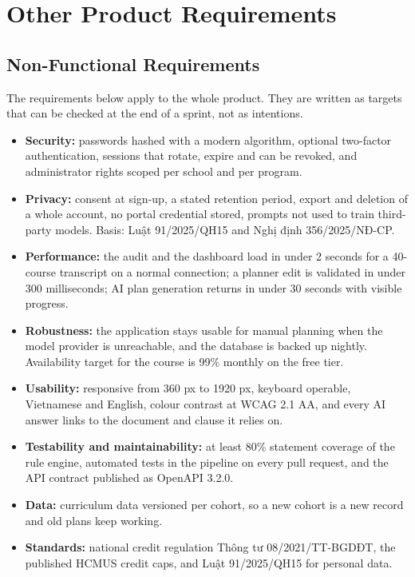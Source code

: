 \documentclass{article}
\begin{document}
\section{Other Product Requirements}
\subsection{Non-Functional Requirements}
The requirements below apply to the whole product. They are written as targets that can be checked at the end of a sprint,
not as intentions.

\begin{itemize}
  \item \textbf{Security:} passwords hashed with a modern algorithm, optional two-factor authentication, sessions that
        rotate, expire and can be revoked, and administrator rights scoped per school and per program.
  \item \textbf{Privacy:} consent at sign-up, a stated retention period, export and deletion of a whole account, no portal
        credential stored, prompts not used to train third-party models. Basis: Luật 91/2025/QH15 and Nghị định
        356/2025/NĐ-CP.
  \item \textbf{Performance:} the audit and the dashboard load in under 2 seconds for a 40-course transcript on a normal
        connection; a planner edit is validated in under 300 milliseconds; AI plan generation returns in under 30 seconds
        with visible progress.
  \item \textbf{Robustness:} the application stays usable for manual planning when the model provider is unreachable, and
        the database is backed up nightly. Availability target for the course is 99\% monthly on the free tier.
  \item \textbf{Usability:} responsive from 360 px to 1920 px, keyboard operable, Vietnamese and English, colour contrast
        at WCAG 2.1 AA, and every AI answer links to the document and clause it relies on.
  \item \textbf{Testability and maintainability:} at least 80\% statement coverage of the rule engine, automated tests in
        the pipeline on every pull request, and the API contract published as OpenAPI 3.2.0.
  \item \textbf{Data:} curriculum data versioned per cohort, so a new cohort is a new record and old plans keep working.
  \item \textbf{Standards:} national credit regulation Thông tư 08/2021/TT-BGDĐT, the published HCMUS credit caps, and
        Luật 91/2025/QH15 for personal data.
\end{itemize}
\end{document}
